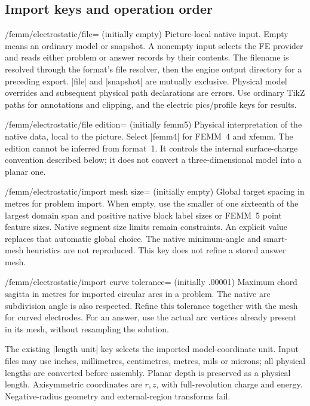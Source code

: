 \subsection{Import keys and operation order}
\begin{key}{/femm/electrostatic/file= (initially empty)}
  Picture-local native input. Empty means an ordinary model or snapshot.
  A nonempty input selects the FE provider and reads either problem or answer
  records by their contents. The filename is resolved through the format's file
  resolver, then the engine output directory for a preceding export.
  |file| and |snapshot| are mutually exclusive. Physical model overrides and
  subsequent physical path declarations are errors. Use ordinary TikZ paths
  for annotations and clipping, and the electric pics/profile keys for results.
\end{key}
\begin{key}{/femm/electrostatic/file edition= (initially femm5)}
  Physical interpretation of the native data, local to the picture. Select
  |femm4| for FEMM~4 and xfemm. The edition cannot be inferred from format~1.
  It controls the internal surface-charge convention described below; it does
  not convert a three-dimensional model into a planar one.
\end{key}
\begin{key}{/femm/electrostatic/import mesh size= (initially empty)}
  Global target spacing in metres for problem import. When empty, use the
  smaller of one sixteenth of the largest domain span and positive native block
  label sizes or FEMM~5 point feature sizes. Native segment size limits remain
  constraints. An explicit value replaces that automatic global choice.
  The native minimum-angle and smart-mesh heuristics are not reproduced.
  This key does not refine a stored answer mesh.
\end{key}
\begin{key}{/femm/electrostatic/import curve tolerance= (initially .00001)}
  Maximum chord sagitta in metres for imported circular arcs in a problem.
  The native arc subdivision angle is also respected. Refine this tolerance
  together with the mesh for curved electrodes. For an answer, use the actual
  arc vertices already present in its mesh, without resampling the solution.
\end{key}

The existing |length unit| key selects the imported model-coordinate unit.
Input files may use inches, millimetres, centimetres, metres, mils or microns;
all physical lengths are converted before assembly. Planar depth is preserved
as a physical length. Axisymmetric coordinates are $r,z$, with full-revolution
charge and energy. Negative-radius geometry and external-region transforms fail.

